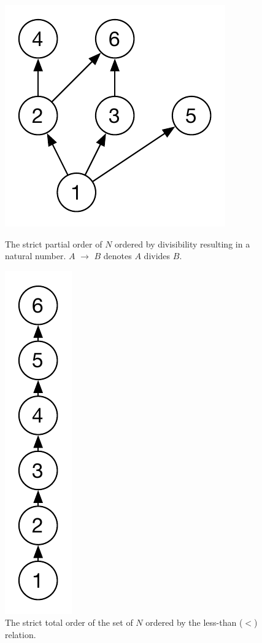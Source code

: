 		\begin{figure}[H]
		\centering
		\begin{minipage}{0.45\textwidth}
			\centering
			\includegraphics[height=\textheight/5]{2background/images/strict-partial.pdf}
		\caption{The strict partial order of $N$ ordered by divisibility resulting in a natural number. $A$ $\rightarrow$ $B$ denotes $A$ divides $B$.}
		\label{fig:background:strict-partial}
		\end{minipage}\hfill
		\begin{minipage}{0.45\textwidth}
			\centering
			\includegraphics[height=\textheight/5]{2background/images/strict-total.pdf}
		\caption{The strict total order of the set of $N$ ordered by the less-than ($<$) relation.}
		\label{fig:background:strict-total}
		\end{minipage}
		\end{figure}
		
